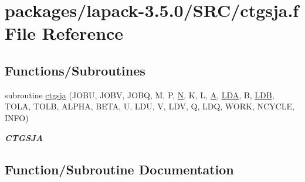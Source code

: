 \hypertarget{ctgsja_8f}{}\section{packages/lapack-\/3.5.0/\+S\+R\+C/ctgsja.f File Reference}
\label{ctgsja_8f}
\subsection*{Functions/\+Subroutines}
\begin{DoxyCompactItemize}
\item 
subroutine \hyperlink{ctgsja_8f_adc1cdf53766720a2d1d85f9186f059c1}{ctgsja} (J\+O\+B\+U, J\+O\+B\+V, J\+O\+B\+Q, M, P, \hyperlink{polmisc_8c_a0240ac851181b84ac374872dc5434ee4}{N}, K, L, \hyperlink{classA}{A}, \hyperlink{example__user_8c_ae946da542ce0db94dced19b2ecefd1aa}{L\+D\+A}, B, \hyperlink{example__user_8c_a50e90a7104df172b5a89a06c47fcca04}{L\+D\+B}, T\+O\+L\+A, T\+O\+L\+B, A\+L\+P\+H\+A, B\+E\+T\+A, U, L\+D\+U, V, L\+D\+V, Q, L\+D\+Q, W\+O\+R\+K, N\+C\+Y\+C\+L\+E, I\+N\+F\+O)
\begin{DoxyCompactList}\small\item\em {\bfseries C\+T\+G\+S\+J\+A} \end{DoxyCompactList}\end{DoxyCompactItemize}


\subsection{Function/\+Subroutine Documentation}
\hypertarget{ctgsja_8f_adc1cdf53766720a2d1d85f9186f059c1}{}
